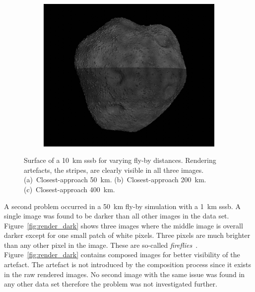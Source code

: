 \begin{figure}[htb]
\begin{subfigure}[b]{0.32\textwidth}
        \caption{}
        \label{fig:render_artefacts_200}
    \end{subfigure}
    \begin{subfigure}[b]{0.32\textwidth}
        \centering
        \includegraphics[width=\textwidth]{doc/thesis/0_figures/rendering_artefacts/400_10_SssbOnly_2017-08-15T115845-190000.jpg}
        \caption{}
        \label{fig:render_artefacts_400}
    \end{subfigure}
    \caption{Surface of a \SI{10}{\kilo\meter} \gls{sssb} for varying fly-by distances. Rendering artefacts, the stripes, are clearly visible in all three images. (a)~Closest-approach \SI{50}{\kilo\meter}. (b)~Closest-approach \SI{200}{\kilo\meter}. (c)~Closest-approach \SI{400}{\kilo\meter}.}
    \label{fig:render_artefacts}
\end{figure}

A second problem occurred in a \SI{50}{\kilo\meter} fly-by simulation with a \SI{1}{\kilo\meter} \gls{sssb}. A single image was found to be darker than all other images in the data set. Figure~\ref{fig:render_dark} shows three images where the middle image is overall darker except for one small patch of white pixels. Three pixels are much brighter than any other pixel in the image. These are so-called \textit{fireflies}~\cite{Valenza2015BlenderCookbook}. Figure~\ref{fig:render_dark} contains composed images for better visibility of the artefact. The artefact is not introduced by the composition process since it exists in the raw rendered images. No second image with the same issue was found in any other data set therefore the problem was not investigated further.

